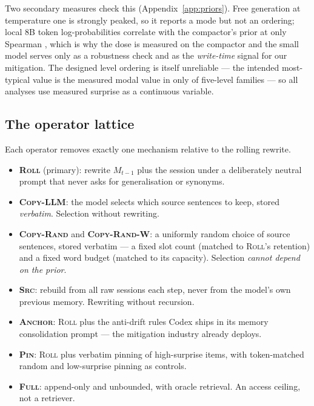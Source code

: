 Two secondary measures check this (Appendix~\ref{app:priors}). Free generation at temperature one is
strongly peaked, so it reports a mode but not an ordering; local 8B token log-probabilities correlate
with the compactor's prior at only Spearman \PThreeRho{}, which is why the dose is measured on the
compactor and the small model serves only as a robustness check and as the \emph{write-time} signal
for our mitigation. The designed level ordering is itself unreliable --- the intended most-typical
value is the measured modal value in only \DesignOrderAgree{} of five-level families --- so all
analyses use measured surprise as a continuous variable.

\subsection{The operator lattice}
Each operator removes exactly one mechanism relative to the rolling rewrite.

\begin{itemize}\itemsep0pt\parskip0pt
\item \textbf{\textsc{Roll}} (primary): rewrite $M_{t-1}$ plus the session under a deliberately
neutral prompt that never asks for generalisation or synonyms.
\item \textbf{\textsc{Copy-LLM}}: the model selects which source sentences to keep, stored
\emph{verbatim}. Selection without rewriting.
\item \textbf{\textsc{Copy-Rand}} and \textbf{\textsc{Copy-Rand-W}}: a uniformly random choice of
source sentences, stored verbatim --- a fixed slot count (matched to \textsc{Roll}'s retention) and a
fixed word budget (matched to its capacity). Selection \emph{cannot depend on the prior}.
\item \textbf{\textsc{Src}}: rebuild from all raw sessions each step, never from the model's own
previous memory. Rewriting without recursion.
\item \textbf{\textsc{Anchor}}: \textsc{Roll} plus the anti-drift rules Codex ships in its memory
consolidation prompt --- the mitigation industry already deploys.
\item \textbf{\textsc{Pin}}: \textsc{Roll} plus verbatim pinning of high-surprise items, with
token-matched random and low-surprise pinning as controls.
\item \textbf{\textsc{Full}}: append-only and unbounded, with oracle retrieval. An access ceiling,
not a retriever.
\end{itemize}

